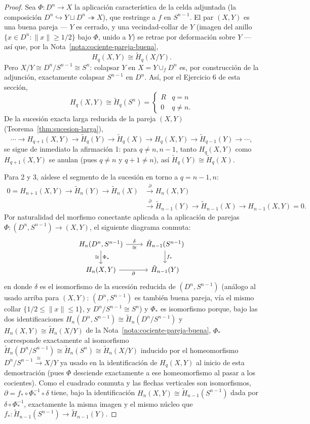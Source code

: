 \documentclass[11pt,a4paper]{article}
\theoremstyle{plain}
\theoremstyle{definition}
\theoremstyle{remark}
\begin{document}
\begin{proof}
Sea $\Phi:D^n\to X$ la aplicación característica de la celda adjuntada
(la composición $D^n\hookrightarrow Y\sqcup D^n\twoheadrightarrow X$), que
restringe a $f$ en $S^{n-1}$. El par $(X,Y)$ es una buena pareja
--- $Y$ es cerrado, y una vecindad-collar de $Y$ (imagen del anillo
$\{x\in D^n:\|x\|\ge1/2\}$ bajo $\Phi$, unido a $Y$) se retrae por
deformación sobre $Y$ --- así que, por la
Nota~\ref{nota:cociente-pareja-buena},
\[
H_q(X,Y)\cong\tilde H_q(X/Y).
\]
Pero $X/Y\cong D^n/S^{n-1}\cong S^n$: colapsar $Y$ en $X=Y\cup_fD^n$ es,
por construcción de la adjunción, exactamente colapsar $S^{n-1}$ en
$D^n$. Así, por el Ejercicio 6 de esta sección,
\[
H_q(X,Y)\cong\tilde H_q(S^n)=\begin{cases}R & q=n\\0 & q\ne n.\end{cases}
\]
De la sucesión exacta larga reducida de la pareja $(X,Y)$
(Teorema~\ref{thm:sucesion-larga}),
\[
\cdots\to H_{q+1}(X,Y)\to\tilde H_q(Y)\to\tilde H_q(X)\to H_q(X,Y)\to\tilde H_{q-1}(Y)\to\cdots,
\]
se sigue de inmediato la afirmación 1: para $q\ne n,n-1$, tanto
$H_q(X,Y)$ como $H_{q+1}(X,Y)$ se anulan (pues $q\ne n$ y $q+1\ne n$), así
$\tilde H_q(Y)\cong\tilde H_q(X)$.

Para 2 y 3, aíslese el segmento de la sucesión en torno a $q=n-1,n$:
\[
\begin{aligned}
0=H_{n+1}(X,Y)\to\tilde H_n(Y)\to\tilde H_n(X)&\xrightarrow{\ \partial\ }H_n(X,Y)\\
&\xrightarrow{\ \partial\ }\tilde H_{n-1}(Y)\to\tilde H_{n-1}(X)\to H_{n-1}(X,Y)=0.
\end{aligned}
\]
Por naturalidad del morfismo conectante aplicada a la aplicación de
parejas $\Phi:(D^n,S^{n-1})\to(X,Y)$, el siguiente diagrama conmuta:
\[
\begin{tikzcd}
H_n(D^n,S^{n-1}) \arrow[r,"\delta","\cong"'] \arrow[d,"\Phi_*","\cong"'] & \tilde H_{n-1}(S^{n-1}) \arrow[d,"f_*"] \\
H_n(X,Y) \arrow[r,swap,"\partial"] & \tilde H_{n-1}(Y)
\end{tikzcd}
\]
en donde $\delta$ es el isomorfismo de la sucesión reducida de
$(D^n,S^{n-1})$ (análogo al usado arriba para $(X,Y)$: $(D^n,S^{n-1})$ es
también buena pareja, vía el mismo collar $\{1/2\le\|x\|\le1\}$, y
$D^n/S^{n-1}\cong S^n$) y $\Phi_*$ es isomorfismo porque, bajo las dos
identificaciones $H_n(D^n,S^{n-1})\cong\tilde H_n(D^n/S^{n-1})$ y
$H_n(X,Y)\cong\tilde H_n(X/Y)$ de la Nota~\ref{nota:cociente-pareja-buena},
$\Phi_*$ corresponde exactamente al isomorfismo
$\tilde H_n(D^n/S^{n-1})\cong\tilde H_n(S^n)\cong\tilde H_n(X/Y)$ inducido
por el homeomorfismo $D^n/S^{n-1}\xrightarrow{\cong}X/Y$ ya usado en la
identificación de $H_q(X,Y)$ al inicio de esta demostración (pues $\Phi$
desciende exactamente a ese homeomorfismo al pasar a los cocientes). Como
el cuadrado conmuta y las flechas verticales son
isomorfismos, $\partial=f_*\circ\Phi_*^{-1}\circ\delta$ tiene, bajo la
identificación $H_n(X,Y)\cong\tilde H_{n-1}(S^{n-1})$ dada por
$\delta\circ\Phi_*^{-1}$, exactamente la misma imagen y el mismo núcleo
que $f_*:\tilde H_{n-1}(S^{n-1})\to\tilde H_{n-1}(Y)$.


\end{proof}
\end{document}
